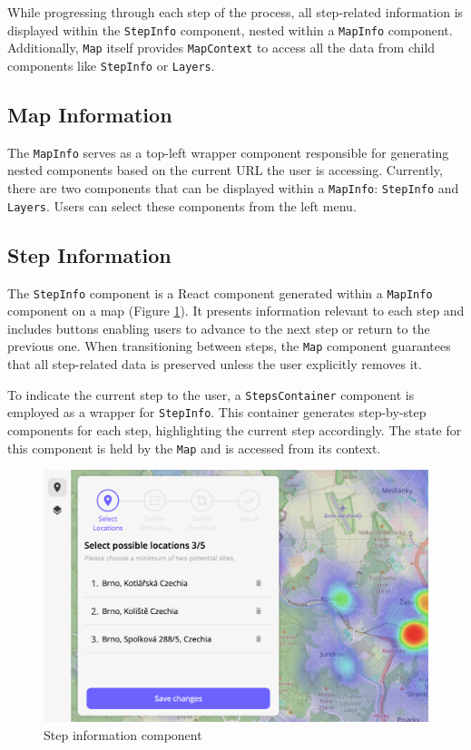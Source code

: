 While progressing through each step of the process, all step-related information is displayed within the \texttt{StepInfo} component, nested within a \texttt{MapInfo} component. Additionally, \texttt{Map} itself provides \texttt{MapContext} to access all the data from child components like \texttt{StepInfo} or \texttt{Layers}.

\subsection{Map Information}

The \texttt{MapInfo} serves as a top-left wrapper component responsible for generating nested components based on the current URL the user is accessing. Currently, there are two components that can be displayed within a \texttt{MapInfo}: \texttt{StepInfo} and \texttt{Layers}. Users can select these components from the left menu.

\subsection{Step Information}
\label{subsec:stepInfo}

The \texttt{StepInfo} component is a React component generated within a \texttt{MapInfo} component on a map (Figure \ref{fig:ui-stepinfo}). It presents information relevant to each step and includes buttons enabling users to advance to the next step or return to the previous one. When transitioning between steps, the \texttt{Map} component guarantees that all step-related data is preserved unless the user explicitly removes it.

To indicate the current step to the user, a \texttt{StepsContainer} component is employed as a wrapper for \texttt{StepInfo}. This container generates step-by-step components for each step, highlighting the current step accordingly. The state for this component is held by the \texttt{Map} and is accessed from its context.

\begin{figure}[ht]\centering
  \centering
  \includegraphics[width=0.8\linewidth]{obrazky-figures/ch6/mapinfo.png}
  \caption{Step information component}
  \label{fig:ui-stepinfo}
\end{figure}

